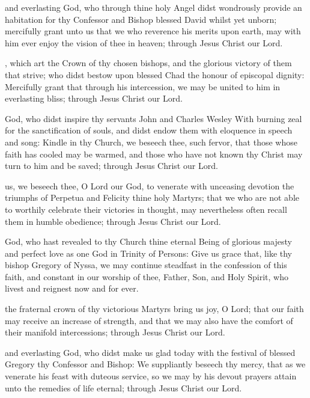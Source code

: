  and everlasting God, who through thine holy Angel didst wondrously provide an habitation for thy Confessor and Bishop blessed David whilst yet unborn; mercifully grant unto us that we who reverence his merits upon earth, may with him ever enjoy the vision of thee in heaven; through Jesus Christ our Lord.

, which art the Crown of thy chosen bishops, and the glorious victory of them that strive; who didst bestow upon blessed Chad the honour of episcopal dignity: Mercifully grant that through his intercession, we may be united to him in everlasting bliss; through Jesus Christ our Lord.

 God, who didst inspire thy servants John and Charles Wesley With burning zeal for the sanctification of souls, and didst endow them with eloquence in speech and song: Kindle in thy Church, we beseech thee, such fervor, that those whose faith has cooled may be warmed, and those who have not known thy Christ may turn to him and be saved; through Jesus Christ our Lord.

 us, we beseech thee, O Lord our God, to venerate with unceasing devotion the triumphs of Perpetua and Felicity thine holy Martyrs; that we who are not able to worthily celebrate their victories in thought, may nevertheless often recall them in humble obedience; through Jesus Christ our Lord.

 God, who hast revealed to thy Church thine eternal Being of glorious majesty and perfect love as one God in Trinity of Persons: Give us grace that, like thy bishop Gregory of Nyssa, we may continue steadfast in the confession of this faith, and constant in our worship of thee, Father, Son, and Holy Spirit, who livest and reignest now and for ever.

 the fraternal crown of thy victorious Martyrs bring us joy, O Lord; that our faith may receive an increase of strength, and that we may also have the comfort of their manifold intercessions; through Jesus Christ our Lord.

 and everlasting God, who didst make us glad today with the festival of blessed Gregory thy Confessor and Bishop: We suppliantly beseech thy mercy, that as we venerate his feast with duteous service, so we may by his devout prayers attain unto the remedies of life eternal; through Jesus Christ our Lord.


